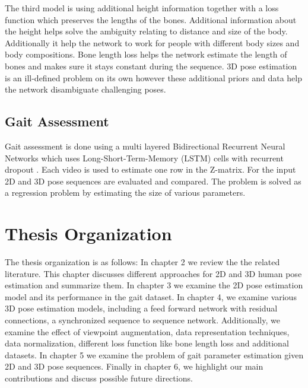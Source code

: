 The third model is using additional height information together with a loss function which preserves the lengths of the bones. Additional information about the height helps solve the ambiguity relating to distance and size of the body. Additionally it help the network to work for people with different body sizes and body compositions. Bone length loss helps the network estimate the length of bones and makes sure it stays constant during the sequence. 3D pose estimation is an ill-defined problem on its own however these additional priors and data help the network disambiguate challenging poses.

\subsection{Gait Assessment}

Gait assessment is done using a multi layered Bidirectional Recurrent Neural Networks \parencite{schuster1997bidirectional} which uses Long-Short-Term-Memory (LSTM) \parencite{hochreiter1997long} cells with recurrent dropout \parencite{semeniuta2016recurrent}. Each video is used to estimate one row in the Z-matrix. For the input 2D and 3D pose sequences are evaluated and compared. The problem is solved as a regression problem by estimating the size of various parameters.

\section{Thesis Organization}

The thesis organization is as follows: In chapter 2 we review the the related literature. This chapter discusses different approaches for 2D and 3D human pose estimation and summarize them. In chapter 3 we examine the 2D pose estimation model and its performance in the gait dataset. In chapter 4, we examine various 3D pose estimation models, including a feed forward network with residual connections, a synchronized sequence to sequence network. Additionally, we examine the effect of viewpoint augmentation, data representation techniques, data normalization, different loss function like bone length loss and additional datasets. In chapter 5 we examine the problem of gait parameter estimation given 2D and 3D pose sequences. Finally in chapter 6, we highlight our main contributions and discuss possible future directions. 